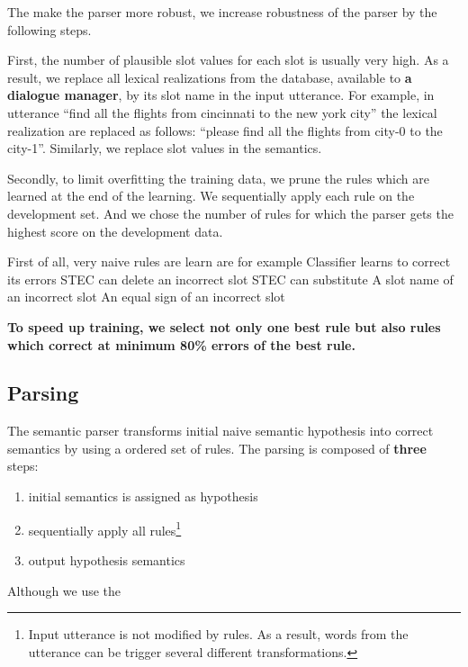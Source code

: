 \documentclass[11pt]{article}
\begin{document}
The make the parser more robust, we increase robustness of the parser by the following steps. 

First, the number of plausible slot values for each slot is usually very high. As a result, we replace all lexical realizations from the database, available to \textbf{a dialogue manager}, by its slot name in the input utterance. For example, in utterance ``find all the flights from cincinnati to the new york city'' the lexical realization are replaced as follows: ``please find all the flights from city-0 to the city-1''. Similarly, we replace slot values in the semantics.

Secondly, to limit overfitting the training data, we prune the rules which are learned at the end of the learning. We sequentially apply each rule on the development set. And we chose the number of rules for which the parser gets the highest score on the development data.



First of all, very naive rules are learn are for example 
Classifier learns to correct its errors
STEC can delete an incorrect slot
STEC can substitute
A slot name of an incorrect slot
An equal sign of an incorrect slot

\textbf{To speed up training, we select not only one best rule but also rules which correct at minimum 80\% errors of the best rule. }

\subsection{Parsing}
The semantic parser transforms initial naive semantic hypothesis into correct semantics by using a ordered set of rules. The parsing is composed of \textbf{three} steps: 
\begin{enumerate}
  \item initial semantics is assigned as hypothesis
  \item sequentially apply all rules\footnote{Input utterance is not modified by rules. As a result, words from the utterance can be trigger several different transformations.}
  \item output hypothesis semantics
\end{enumerate}






Although we use the 

\end{document}

